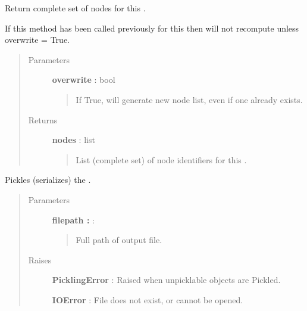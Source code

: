 \documentclass[letterpaper,10pt,english]{sphinxmanual}
\begin{document}
\begin{fulllineitems}
\begin{fulllineitems}
\end{fulllineitems}


\begin{fulllineitems}
\label{tethne:tethne.data.GraphCollection.nodes}
Return complete set of nodes for this {\hyperref[tethne:tethne.data.GraphCollection]{}} .

If this method has been called previously for this
{\hyperref[tethne:tethne.data.GraphCollection]{}} then will not recompute unless overwrite =
True.
\begin{quote}\begin{description}
\item[{Parameters }] \leavevmode
\textbf{overwrite} : bool
\begin{quote}

If True, will generate new node list, even if one already exists.
\end{quote}

\item[{Returns }] \leavevmode
\textbf{nodes} : list
\begin{quote}

List (complete set) of node identifiers for this
{\hyperref[tethne:tethne.data.GraphCollection]{}} .
\end{quote}

\end{description}\end{quote}

\end{fulllineitems}


\begin{fulllineitems}
\label{tethne:tethne.data.GraphCollection.save}
Pickles (serializes) the {\hyperref[tethne:tethne.data.GraphCollection]{}} .
\begin{quote}\begin{description}
\item[{Parameters }] \leavevmode
\textbf{filepath :} :
\begin{quote}

Full path of output file.
\end{quote}

\item[{Raises }] \leavevmode
\textbf{PicklingError} : Raised when unpicklable objects are Pickled.

\textbf{IOError} : File does not exist, or cannot be opened.

\end{description}\end{quote}

\end{fulllineitems}


\end{fulllineitems}
\end{document}
